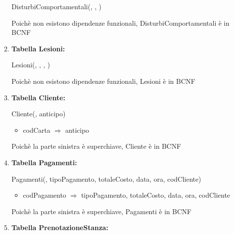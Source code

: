 \documentclass[12pt,a4paper]{article}
\begin{document}
\begin{enumerate}
DisturbiComportamentali(\underline{}, \underline{}, \underline{})

Poichè non esistono dipendenze funzionali, DisturbiComportamentali è in BCNF
\vspace{10pt}



\item[] \textbf{Tabella Lesioni:}

Lesioni(\underline{}, \underline{}, \underline{}, \underline{})

Poichè non esistono dipendenze funzionali, Lesioni è in BCNF
\vspace{10pt}



\item[] \textbf{Tabella Cliente:}

Cliente(\underline{}, anticipo)
\begin{itemize}
\vspace{-5pt}
\item codCarta $\Rightarrow$ anticipo
\vspace{-5pt}
\end{itemize}
Poichè la parte sinistra è superchiave, Cliente è in BCNF
\vspace{10pt}



\item[] \textbf{Tabella Pagamenti:}

Pagamenti(\underline{}, tipoPagamento, totaleCosto, data, ora,  codCliente)
\begin{itemize}
\vspace{-5pt}
\item codPagamento $\Rightarrow$ tipoPagamento, totaleCosto, data, ora, codCliente
\vspace{-5pt}
\end{itemize}
Poichè la parte sinistra è superchiave, Pagamenti è in BCNF
\vspace{10pt}



\item[] \textbf{Tabella PrenotazioneStanza:}


\end{enumerate}
\end{document}
